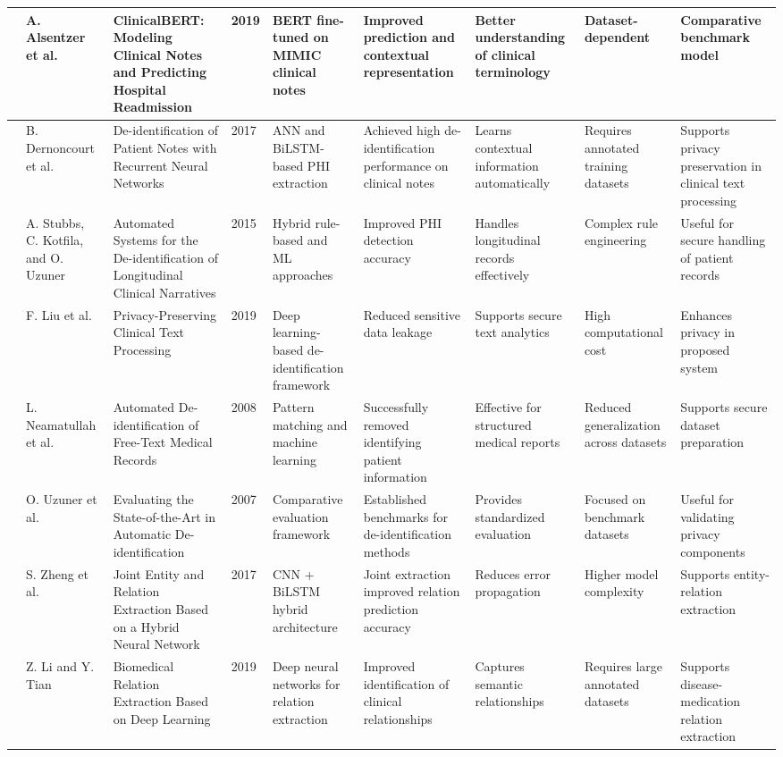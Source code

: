 \begin{landscape}
\begin{singlespace}
\begin{longtable}{|p{0.8cm}|p{1.8cm}|p{3.2cm}|p{0.8cm}|p{3.6cm}|p{3.6cm}|p{2.5cm}|p{2.5cm}|p{3.2cm}|}
\hline
\cite{ref47} & A. Alsentzer et al. & ClinicalBERT: Modeling Clinical Notes and Predicting Hospital Readmission & 2019 & BERT fine-tuned on MIMIC clinical notes & Improved prediction and contextual representation & Better understanding of clinical terminology & Dataset-dependent & Comparative benchmark model \\
\hline
\cite{ref48} & B. Dernoncourt et al. & De-identification of Patient Notes with Recurrent Neural Networks & 2017 & ANN and BiLSTM-based PHI extraction & Achieved high de-identification performance on clinical notes & Learns contextual information automatically & Requires annotated training datasets & Supports privacy preservation in clinical text processing \\
\hline
\cite{ref49} & A. Stubbs, C. Kotfila, and O. Uzuner & Automated Systems for the De-identification of Longitudinal Clinical Narratives & 2015 & Hybrid rule-based and ML approaches & Improved PHI detection accuracy & Handles longitudinal records effectively & Complex rule engineering & Useful for secure handling of patient records \\
\hline
\cite{ref50} & F. Liu et al. & Privacy-Preserving Clinical Text Processing & 2019 & Deep learning-based de-identification framework & Reduced sensitive data leakage & Supports secure text analytics & High computational cost & Enhances privacy in proposed system \\
\hline
\cite{ref51} & L. Neamatullah et al. & Automated De-identification of Free-Text Medical Records & 2008 & Pattern matching and machine learning & Successfully removed identifying patient information & Effective for structured medical reports & Reduced generalization across datasets & Supports secure dataset preparation \\
\hline
\cite{ref52} & O. Uzuner et al. & Evaluating the State-of-the-Art in Automatic De-identification & 2007 & Comparative evaluation framework & Established benchmarks for de-identification methods & Provides standardized evaluation & Focused on benchmark datasets & Useful for validating privacy components \\
\hline
\cite{ref53} & S. Zheng et al. & Joint Entity and Relation Extraction Based on a Hybrid Neural Network & 2017 & CNN + BiLSTM hybrid architecture & Joint extraction improved relation prediction accuracy & Reduces error propagation & Higher model complexity & Supports entity-relation extraction \\
\hline
\cite{ref54} & Z. Li and Y. Tian & Biomedical Relation Extraction Based on Deep Learning & 2019 & Deep neural networks for relation extraction & Improved identification of clinical relationships & Captures semantic relationships & Requires large annotated datasets & Supports disease-medication relation extraction \\

\end{longtable}
\end{singlespace}
\end{landscape}
